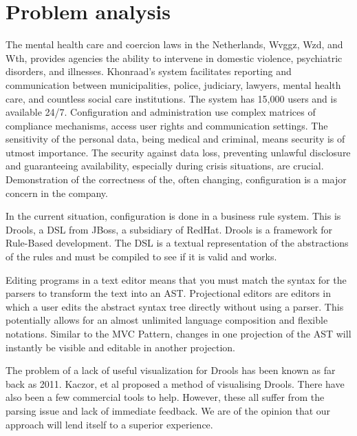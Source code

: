\section{Problem analysis}

The mental health care and coercion laws in the Netherlands, Wvggz, Wzd, and Wth, provides agencies the ability to intervene in domestic violence, psychiatric disorders, and illnesses.
Khonraad's system facilitates reporting and communication between municipalities, police, judiciary, lawyers, mental health care, and countless social care institutions.
The system has 15,000 users and is available 24/7. Configuration and administration use complex matrices of compliance mechanisms, access user rights and communication settings.
The sensitivity of the personal data, being medical and criminal, means security is of utmost importance.
The security against data loss, preventing unlawful disclosure and guaranteeing availability, especially during crisis situations, are crucial.
Demonstration of the correctness of the, often changing, configuration is a major concern in the company. 

In the current situation, configuration is done in a business rule system. This is Drools, a DSL from JBoss, a subsidiary of RedHat.
Drools is a framework for Rule-Based development.
The DSL is a textual representation of the abstractions of the rules and must be compiled to see if it is valid and works.

Editing programs in a text editor means that you must match the syntax for the parsers to transform the text into an AST.
Projectional editors are editors in which a user edits the abstract syntax tree directly without using a parser\cite{voelter2014generic}.
This potentially allows for an almost unlimited language composition and flexible notations.
Similar to the MVC Pattern, changes in one projection of the AST will instantly be visible and editable in another projection\cite{guttormsen2017consistent}.

The problem of a lack of useful visualization for Drools has been known as far back as 2011.
Kaczor, et al\cite{kaczor2011visual} proposed a method of visualising Drools. 
There have also been a few commercial tools to help.
However, these all suffer from the parsing issue and lack of immediate feedback. 
We are of the opinion that our approach will lend itself to a superior experience.
